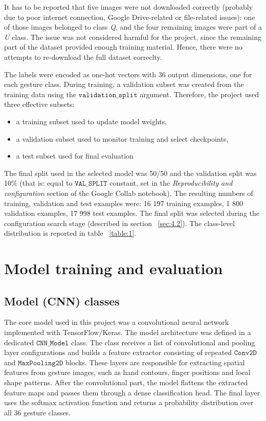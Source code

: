 \documentclass{article}
\newcommand{\code}[1]{\texttt{#1}} %
\begin{document}
It has to be reported that five images were not downloaded correctly (probably due to poor internet connection, Google Drive-related or
file-related issues): one of those images belonged to class \textit{Q}, and the four remaining images were part of a \textit{U} class. The issue
was not considered harmful for the project, since the remaining part of the dataset provided enough training material. Hence, there were 
no attempts to re-download the full dataset correclty.

The labels were encoded as one-hot vectors with 36 output dimensions, one for each gesture class. During training, a validation subset was created from the training
data using the $\code{validation\_split}$ argument. Therefore, the project used three effective subsets:

\begin{itemize}
  \item a training subset used to update model weights,
  \item a validation subset used to monitor training and select checkpoints,
  \item a test subset used for final evaluation
\end{itemize}  

The final split used in the selected model was 50/50 and the validation split was 10\% (that is: equal to $\code{VAL\_SPLIT}$ constant, set in the 
\textit{Reproducibility and configuration} section of the Google Collab notebook). The resulting numbers of training, validation and test examples were: 
16 197 training examples, 1 800 validation examples, 17 998 test examples. The final split was selected during the configuration search stage 
(described in section ~\ref{sec:4.2}). The class-level distribution is reported in table ~\ref{table:1}.

\section{Model training and evaluation}
\label{sec:4}
\subsection{Model (CNN) classes}
\label{sec:4.1}
The core model used in this project was a convolutional neural network implemented with TensorFlow/Keras. The model architecture was defined in a dedicated $\code{CNN\_Model}$ 
class. The class receives a list of convolutional and pooling layer configurations and builds a feature extractor consisting of repeated $\code{Conv2D}$ and $\code{MaxPooling2D}$ 
blocks. These layers are responsible for extracting spatial features from gesture images, such as hand contours, finger positions and local shape patterns. After the convolutional 
part, the model flattens the extracted feature maps and passes them through a dense classification head. The final layer uses the softmax activation function and returns a probability 
distribution over all 36 gesture classes.  
\end{document}
